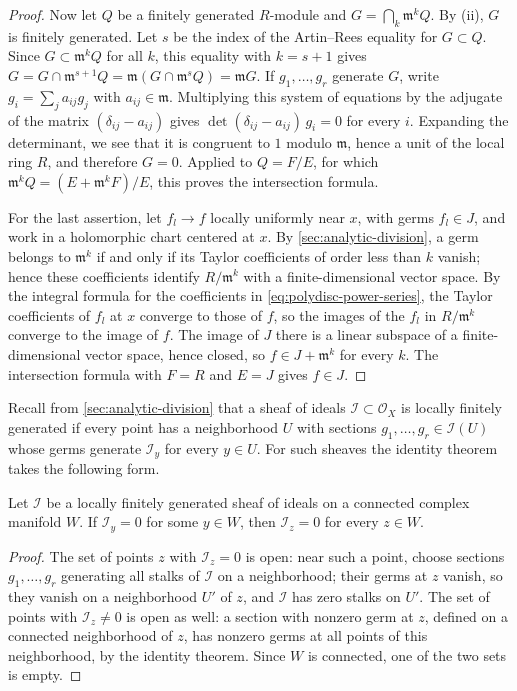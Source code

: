 \begin{proof}
Now let $Q$ be a finitely generated $R$-module and $G=\bigcap_k\mathfrak m^kQ$. By (ii), $G$ is finitely generated. Let $s$ be the index of the Artin--Rees equality for $G\subset Q$. Since $G\subset\mathfrak m^kQ$ for all $k$, this equality with $k=s+1$ gives $G=G\cap\mathfrak m^{s+1}Q=\mathfrak m(G\cap\mathfrak m^sQ)=\mathfrak mG$. If $g_1,\ldots,g_r$ generate $G$, write $g_i=\sum_ja_{ij}g_j$ with $a_{ij}\in\mathfrak m$. Multiplying this system of equations by the adjugate of the matrix $(\delta_{ij}-a_{ij})$ gives $\det(\delta_{ij}-a_{ij})\,g_i=0$ for every $i$. Expanding the determinant, we see that it is congruent to $1$ modulo $\mathfrak m$, hence a unit of the local ring $R$, and therefore $G=0$. Applied to $Q=F/E$, for which $\mathfrak m^kQ=(E+\mathfrak m^kF)/E$, this proves the intersection formula.

For the last assertion, let $f_l\to f$ locally uniformly near $x$, with germs $f_l\in J$, and work in a holomorphic chart centered at $x$. By \cref{sec:analytic-division}, a germ belongs to $\mathfrak m^k$ if and only if its Taylor coefficients of order less than $k$ vanish; hence these coefficients identify $R/\mathfrak m^k$ with a finite-dimensional vector space. By the integral formula for the coefficients in \eqref{eq:polydisc-power-series}, the Taylor coefficients of $f_l$ at $x$ converge to those of $f$, so the images of the $f_l$ in $R/\mathfrak m^k$ converge to the image of $f$. The image of $J$ there is a linear subspace of a finite-dimensional vector space, hence closed, so $f\in J+\mathfrak m^k$ for every $k$. The intersection formula with $F=R$ and $E=J$ gives $f\in J$.
\end{proof}

Recall from \cref{sec:analytic-division} that a sheaf of ideals $\mathcal I\subset\mathcal O_X$ is locally finitely generated if every point has a neighborhood $U$ with sections $g_1,\ldots,g_r\in\mathcal I(U)$ whose germs generate $\mathcal I_y$ for every $y\in U$. For such sheaves the identity theorem takes the following form.

\begin{lemma}\label{lem:locally-finite-ideal-identity}
Let $\mathcal I$ be a locally finitely generated sheaf of ideals on a connected complex manifold $W$. If $\mathcal I_y=0$ for some $y\in W$, then $\mathcal I_z=0$ for every $z\in W$.
\end{lemma}
\begin{proof}
The set of points $z$ with $\mathcal I_z=0$ is open: near such a point, choose sections $g_1,\ldots,g_r$ generating all stalks of $\mathcal I$ on a neighborhood; their germs at $z$ vanish, so they vanish on a neighborhood $U'$ of $z$, and $\mathcal I$ has zero stalks on $U'$. The set of points with $\mathcal I_z\neq0$ is open as well: a section with nonzero germ at $z$, defined on a connected neighborhood of $z$, has nonzero germs at all points of this neighborhood, by the identity theorem. Since $W$ is connected, one of the two sets is empty.
\end{proof}

